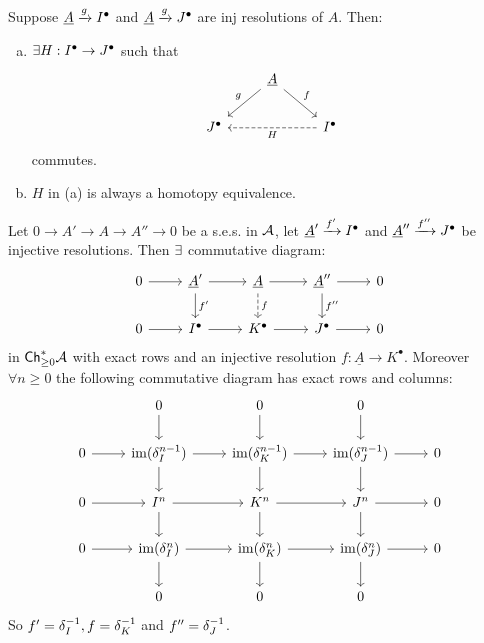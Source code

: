 \documentclass[a4paper]{report}
\begin{document}
\begin{cor}
  Suppose $\underline A \xrightarrow g I^{\bullet}$ and $\underline A \xrightarrow g J^{\bullet}$ are inj resolutions of $A$. Then:
\begin{enumerate}[(a)]
  \item $\exists H : I^{\bullet} \to J^{\bullet}$ such that
        \[\begin{tikzcd}
          & \underline A \arrow[rd, "f"] \arrow[ld, "g"'] &                                   \\
J^\bullet &                                               & I^\bullet \arrow[ll, "H", dashed]
\end{tikzcd}\] commutes.
        \item $H$ in (a) is always a homotopy equivalence.
  \end{enumerate}
\end{cor}


\begin{lemm}[Horseshoe 2]
  Let $0 \to A' \to A \to A'' \to 0$ be a s.e.s. in $\mathcal{A}$, let $\underline A' \xrightarrow {f'} I^{\bullet}$ and $\underline A'' \xrightarrow {f''} J^{\bullet}$ be injective resolutions. Then $\exists$ commutative diagram:
  \[\begin{tikzcd}
0 \arrow[r] & \underline A' \arrow[r] \arrow[d, "f'"] & \underline A \arrow[r] \arrow[d, "f", dashed] & \underline A'' \arrow[r] \arrow[d, "f''"] & 0 \\
0 \arrow[r] & I^\bullet \arrow[r]                     & K^\bullet \arrow[r]                           & J^\bullet \arrow[r]                       & 0
\end{tikzcd}\]
in $\mathsf{Ch}^*_{\ge 0} \mathcal{A}$ with exact rows and an injective resolution $f: \underline A \to K^{\bullet}$. Moreover $\forall n \ge 0$ the following commutative diagram has exact rows and columns:
\[\begin{tikzcd}
            & 0 \arrow[d]                                            & 0 \arrow[d]                                            & 0 \arrow[d]                                            &   \\
0 \arrow[r] & \operatorname{im} (\delta_I^{n-1}) \arrow[r] \arrow[d] & \operatorname{im} (\delta_K^{n-1}) \arrow[r] \arrow[d] & \operatorname{im} (\delta_J^{n-1}) \arrow[r] \arrow[d] & 0 \\
0 \arrow[r] & I^n \arrow[r] \arrow[d]                                & K^n \arrow[r] \arrow[d]                                & J^n \arrow[r] \arrow[d]                                & 0 \\
0 \arrow[r] & \operatorname{im} (\delta_I^{n}) \arrow[r] \arrow[d]   & \operatorname{im} (\delta_K^{n}) \arrow[r] \arrow[d]   & \operatorname{im} (\delta_J^{n}) \arrow[r] \arrow[d]   & 0 \\
            & 0                                                      & 0                                                      & 0                                                      &
          \end{tikzcd}\]
        So $f' = \delta_{I}^{-1}, f = \delta^{-1}_{K}$ and $f'' = \delta_{J}^{-1}$.
\end{lemm}
\end{document}

